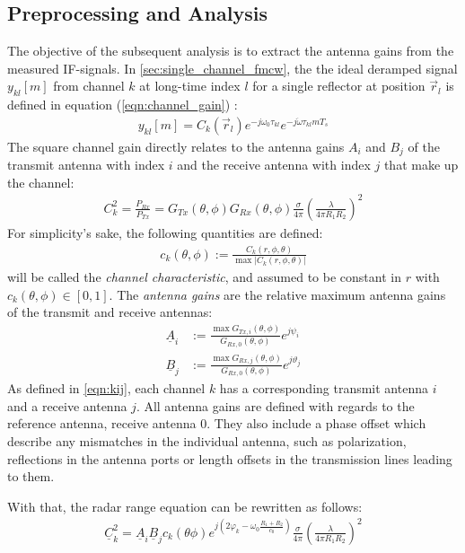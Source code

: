 \subsection{Preprocessing and Analysis}
The objective of the subsequent analysis is to extract the antenna gains from the measured IF-signals.
In \autoref{sec:single_channel_fmcw}, 
the the ideal deramped signal $y_{kl}[m]$ from channel $k$ at long-time index $l$
for a single reflector at position $\vec r_l$
is defined in equation (\ref{eqn:channel_gain}) :
\begin{align*}
    y_{kl}[m] =  C_k(\vec r_l)e^{-j\omega_0\tau_{kl}}e^{-j\dot\omega\tau_{kl}mT_s}
\end{align*}
The square channel gain directly relates to the antenna gains $A_i$ and $B_j$ 
of the transmit antenna with index $i$ and the receive antenna with index $j$ that make up the channel:
\begin{align*}
    C_k^2 = \frac{P_{Rx}}{P_{Tx}} 
    = G_{Tx}(\theta,\phi)  G_{Rx}(\theta,\phi) \frac{\sigma}{4\pi} \left(\frac{\lambda}{4\pi R_1 R_2}\right)^2
\end{align*}
For simplicity's sake, the following quantities are defined:
\begin{align}
    c_k(\theta,\phi) := \frac{C_k(r,\phi,\theta)}{\max |C_k(r,\phi,\theta)|}
\end{align}
will be called the \emph{channel characteristic}, and assumed to be constant in $r$ with $c_k(\theta,\phi) \in [0,1]$.
The \emph{antenna gains} are the relative maximum antenna gains of the transmit and receive antennas:
\begin{align}
    \underline A_i &:=  \frac{\max G_{Tx,i}(\theta,\phi)}{ G_{Rx,0}(\theta,\phi)}e^{j\psi_i} \\
    \underline B_j &:=  \frac{\max G_{Rx,j}(\theta,\phi)}{ G_{Rx,0}(\theta,\phi)}e^{j\vartheta_j}
\end{align}
As defined in \autoref{eqn:kij}, each channel $k$ has a corresponding transmit antenna $i$ and a receive antenna $j$.
All antenna gains are defined with regards to the reference antenna, receive antenna 0.
They also include a phase offset which describe any mismatches in the individual antenna, 
such as polarization, reflections in the antenna ports or length offsets in the transmission lines leading to them.

With that, the radar range equation can be rewritten as follows:
\begin{align*}
    \underline C_k^2 = \underline A_i \underline B_j c_k(\theta\phi) e^{j\left(2\varphi_k-\omega_0\frac{R_1+R_2}{c_0}\right)}
                        \frac{\sigma}{4\pi} \left(\frac{\lambda}{4\pi R_1 R_2}\right)^2
\end{align*}


